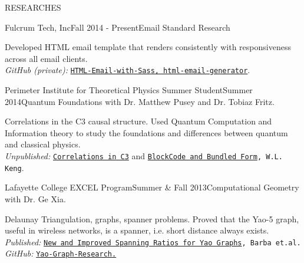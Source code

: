 \documentclass{resume} %
\begin{document}
\begin{rSection}{RESEARCHES}

\begin{rSubsection}{Fulcrum Tech, Inc}{Fall 2014 - Present}{Email Standard Research}{}
\item Developed HTML email template that renders consistently with responsiveness across all email clients.\\
{\em GitHub (private):} {\tt \href{https://github.com/kengz}{HTML-Email-with-Sass, html-email-generator}}.
\end{rSubsection}


\begin{rSubsection}{Perimeter Institute for Theoretical Physics Summer Student}{Summer 2014}{Quantum Foundations with Dr. Matthew Pusey and Dr. Tobiaz Fritz.}{}
\item Correlations in the C3 causal structure. Used Quantum Computation and Information theory to study the foundations and differences between quantum and classical physics. \\
{\em Unpublished:} {\tt \href{https://github.com/kengz/Quantum-Foundations-Correlations/blob/master/Keng%20Correlations%20in%20C3.pdf}{Correlations in C3}} and {\tt \href{https://github.com/kengz/Quantum-Foundations-Correlations/blob/master/Keng%20blockcode.pdf}{BlockCode and Bundled Form}, W.L. Keng}.
\end{rSubsection}


\begin{rSubsection}{Lafayette College EXCEL Program}{Summer \& Fall 2013}{Computational Geometry with Dr. Ge Xia.}{}
\item Delaunay Triangulation, graphs, spanner problems. Proved that the Yao-5 graph, useful in wireless networks, is a spanner, i.e. short distance always exists.\\
{\em Published:} {\tt \href{http://arxiv.org/abs/1307.5829}{New and Improved Spanning Ratios for Yao Graphs}, Barba et.al.}\\
{\em GitHub:} {\tt \href{https://github.com/kengz/Yao-Graph-Research}{Yao-Graph-Research.}}
\end{rSubsection}


\end{rSection}
\end{document}
